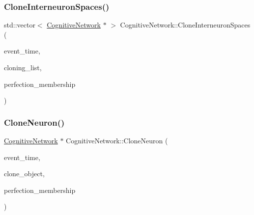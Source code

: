 \subsubsection{\texorpdfstring{Clone\+Interneuron\+Spaces()}{CloneInterneuronSpaces()}}
{\footnotesize\ttfamily std\+::vector$<$ \mbox{\hyperlink{classCognitiveNetwork}{Cognitive\+Network}} $\ast$ $>$ Cognitive\+Network\+::\+Clone\+Interneuron\+Spaces (\begin{DoxyParamCaption}\item[{std\+::chrono\+::time\+\_\+point$<$ \mbox{\hyperlink{universe_8h_a0ef8d951d1ca5ab3cfaf7ab4c7a6fd80}{Clock}} $>$}]{event\+\_\+time,  }\item[{std\+::vector$<$ \mbox{\hyperlink{classCognitiveNetwork}{Cognitive\+Network}} $\ast$$>$}]{cloning\+\_\+list,  }\item[{double}]{perfection\+\_\+membership }\end{DoxyParamCaption})}

\mbox{\label{classCognitiveNetwork_abf42d64965d64836d6fcbd7ce33c8db4}} 
\subsubsection{\texorpdfstring{Clone\+Neuron()}{CloneNeuron()}}
{\footnotesize\ttfamily \mbox{\hyperlink{classCognitiveNetwork}{Cognitive\+Network}} $\ast$ Cognitive\+Network\+::\+Clone\+Neuron (\begin{DoxyParamCaption}\item[{std\+::chrono\+::time\+\_\+point$<$ \mbox{\hyperlink{universe_8h_a0ef8d951d1ca5ab3cfaf7ab4c7a6fd80}{Clock}} $>$}]{event\+\_\+time,  }\item[{\mbox{\hyperlink{classCognitiveNetwork}{Cognitive\+Network}} $\ast$}]{clone\+\_\+object,  }\item[{double}]{perfection\+\_\+membership }\end{DoxyParamCaption})}

\mbox{\label{classCognitiveNetwork_a8852409e92434523ddbd48d699c5609f}} 
